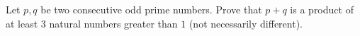 Let $p,q$ be two consecutive odd prime numbers. Prove that $p+q$ is a product of at least $3$ natural numbers greater than $1$ (not necessarily different).